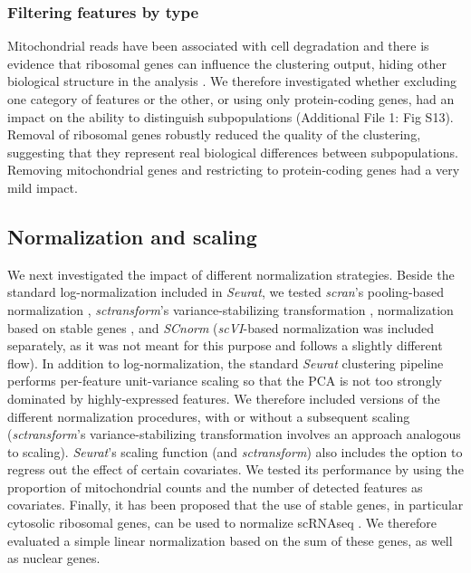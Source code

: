 \documentclass{bmcart}
\begin{document}
\subsubsection*{Filtering features by type}

Mitochondrial reads have been associated with cell degradation and there is evidence that ribosomal genes can influence the clustering output, hiding other biological structure in the analysis \cite{freytagComparison2018}. We therefore investigated whether excluding one category of features or the other, or using only protein-coding genes, had an impact on the ability to distinguish subpopulations (Additional File 1: Fig S13). Removal of ribosomal genes robustly reduced the quality of the clustering, suggesting that they represent real biological differences between subpopulations. Removing mitochondrial genes and restricting to protein-coding genes had a very mild impact.

\subsection*{Normalization and scaling}

We next investigated the impact of different normalization strategies. Beside the standard log-normalization included in \textit{Seurat}, we tested \textit{scran}'s pooling-based normalization \cite{lunPooling2016}, \textit{sctransform}'s variance-stabilizing transformation \cite{hafemeisterSCtransform2019}, normalization based on stable genes \cite{linStableGenes2018, deekeStablyExpressed2018}, and \textit{SCnorm} \cite{bacherSCnorm2017} (\textit{scVI}-based normalization \cite{lopezDeep2018} was included separately, as it was not meant for this purpose and follows a slightly different flow). In addition to log-normalization, the standard \textit{Seurat} clustering pipeline performs per-feature unit-variance scaling so that the PCA is not too strongly dominated by highly-expressed features. We therefore included versions of the different normalization procedures, with or without a subsequent scaling (\textit{sctransform}'s variance-stabilizing transformation involves an approach analogous to scaling). 
\textit{Seurat}'s scaling function (and \textit{sctransform}) also includes the option to regress out the effect of certain covariates. We tested its performance by using the proportion of mitochondrial counts and the number of detected features as covariates. Finally, it has been proposed that the use of stable genes, in particular cytosolic ribosomal genes, can be used to normalize scRNAseq \cite{deekeStablyExpressed2018}. We therefore evaluated a simple linear normalization based on the sum of these genes, as well as nuclear genes.
\end{document}
